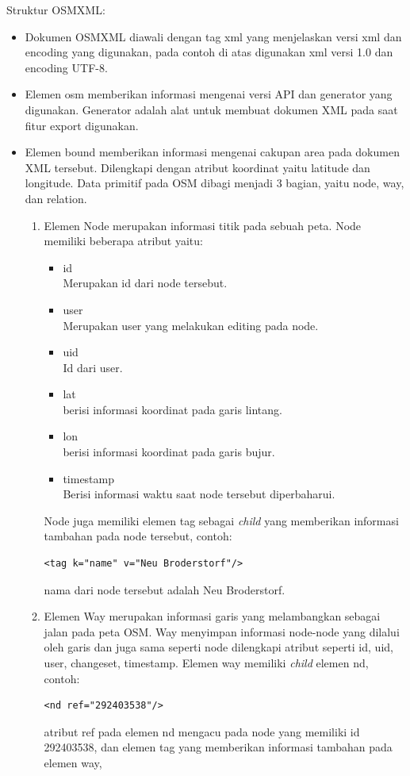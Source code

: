 Struktur OSMXML:
\begin{itemize}
\item Dokumen OSMXML diawali dengan tag xml yang menjelaskan versi xml dan
encoding yang digunakan, pada contoh di atas digunakan xml versi 1.0 dan
encoding UTF-8.

\item Elemen osm memberikan informasi mengenai versi API dan generator yang
digunakan. Generator adalah alat untuk membuat dokumen XML pada saat fitur
export digunakan. 

\item Elemen bound memberikan informasi mengenai cakupan area pada dokumen XML
tersebut. Dilengkapi dengan atribut koordinat yaitu latitude dan longitude.
Data primitif pada OSM dibagi menjadi 3 bagian, yaitu node, way, dan relation.
\begin{enumerate}
\item Elemen Node merupakan informasi titik pada sebuah peta. Node memiliki
beberapa atribut yaitu:
\begin{itemize}
\item id \\
Merupakan id dari node tersebut.

\item user \\ 
Merupakan user yang melakukan editing pada node.

\item uid \\
Id dari user.

\item lat \\
berisi informasi koordinat pada garis lintang.

\item lon \\
berisi informasi koordinat pada garis bujur.

\item timestamp \\
Berisi informasi waktu saat node tersebut diperbaharui.
\end{itemize}
Node juga memiliki elemen tag sebagai \textit{child} yang memberikan informasi
tambahan pada node tersebut, contoh:
\begin{verbatim}
<tag k="name" v="Neu Broderstorf"/>
\end{verbatim}
nama dari node tersebut adalah Neu Broderstorf.

\item Elemen Way merupakan informasi garis yang melambangkan sebagai jalan pada
peta OSM. Way menyimpan informasi node-node yang dilalui oleh garis dan juga
sama seperti node dilengkapi atribut seperti id, uid, user, changeset,
timestamp. Elemen way memiliki \textit{child} elemen nd, contoh:  
\begin{verbatim}
<nd ref="292403538"/>
\end{verbatim}
atribut ref pada elemen nd mengacu pada node yang memiliki id 292403538, dan
elemen tag yang memberikan informasi tambahan pada elemen way,


\end{enumerate}
\end{itemize}
